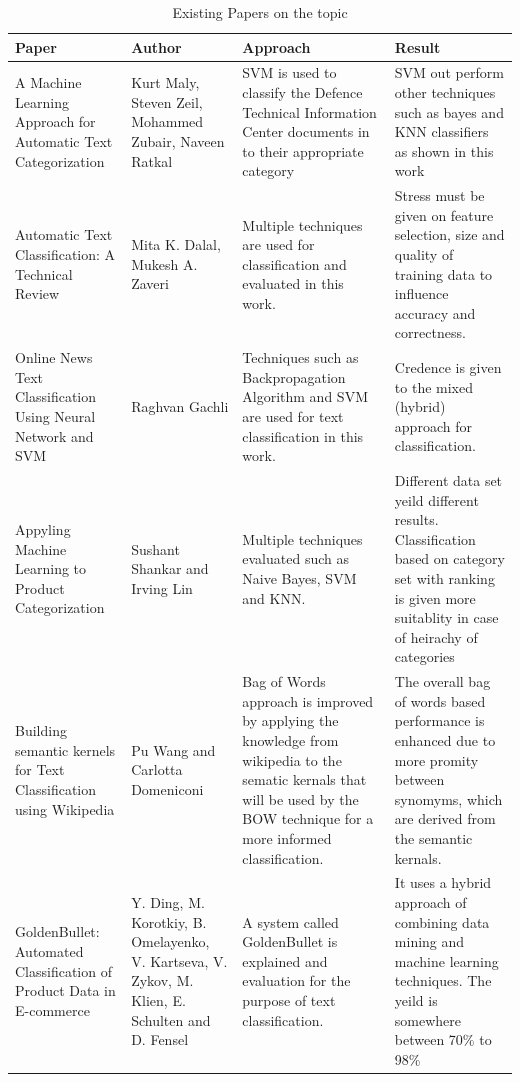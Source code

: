 \documentclass[12pt]{book}
\begin{document}
\begin{longtable}[c]{ |p{3cm}|p{3cm}|p{3cm}|p{3cm}|  }
  \caption{Existing Papers on the topic \label{tab:existing_worexisting_work}}\\
  \hline
  Paper & Author & Approach & Result\\
  \hline
  \endhead

  A Machine Learning Approach for Automatic Text Categorization & Kurt Maly, Steven Zeil,  Mohammed Zubair, Naveen Ratkal& SVM is used to classify the Defence Technical Information Center documents in to their appropriate category& SVM out perform other techniques such as bayes and KNN classifiers as shown in this work\\ 
  \hline
  Automatic Text Classification: A Technical Review & Mita K. Dalal, Mukesh A. Zaveri & Multiple techniques are used for classification and evaluated in this work.& Stress must be given on feature selection, size and quality of training data to influence accuracy and correctness.\\ 
  \hline
  Online News Text Classification Using Neural Network and SVM& Raghvan Gachli & Techniques such as Backpropagation Algorithm and SVM are used for text classification in this work. & Credence is given to the mixed (hybrid) approach for classification.\\ 
  \hline
  Appyling Machine Learning to Product Categorization & Sushant Shankar and Irving Lin& Multiple techniques evaluated such as Naive Bayes, SVM and KNN. & Different data set yeild different results. Classification based on category set with ranking is given more suitablity in case of heirachy of categories\\ 
  \hline
  Building semantic kernels for Text Classification using Wikipedia& Pu Wang and Carlotta Domeniconi& Bag of Words approach is improved by applying the knowledge from wikipedia to the sematic kernals that will be used by the BOW technique for a more informed classification. & The overall bag of words based performance is enhanced due to more promity between synomyms, which are derived from the semantic kernals.\\ 
  \hline
  GoldenBullet: Automated Classification of Product Data in E-commerce & Y. Ding, M. Korotkiy, B. Omelayenko, V. Kartseva, V. Zykov, M. Klien, E. Schulten and D. Fensel & A system called GoldenBullet is explained and evaluation for the purpose of text classification. & It uses a hybrid approach of combining data mining and machine learning techniques. The yeild is somewhere between 70\% to 98\%\\
  \hline

\end{longtable}
\end{document}
